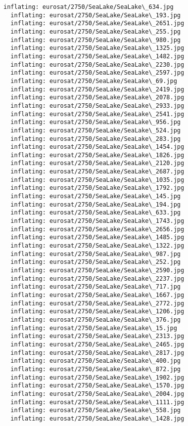\documentclass[11pt]{article}
\begin{document}
\begin{Verbatim}[commandchars=\\\{\}]
  inflating: eurosat/2750/SeaLake/SeaLake\_634.jpg
  inflating: eurosat/2750/SeaLake/SeaLake\_193.jpg
  inflating: eurosat/2750/SeaLake/SeaLake\_2651.jpg
  inflating: eurosat/2750/SeaLake/SeaLake\_255.jpg
  inflating: eurosat/2750/SeaLake/SeaLake\_980.jpg
  inflating: eurosat/2750/SeaLake/SeaLake\_1325.jpg
  inflating: eurosat/2750/SeaLake/SeaLake\_1482.jpg
  inflating: eurosat/2750/SeaLake/SeaLake\_2230.jpg
  inflating: eurosat/2750/SeaLake/SeaLake\_2597.jpg
  inflating: eurosat/2750/SeaLake/SeaLake\_69.jpg
  inflating: eurosat/2750/SeaLake/SeaLake\_2419.jpg
  inflating: eurosat/2750/SeaLake/SeaLake\_2078.jpg
  inflating: eurosat/2750/SeaLake/SeaLake\_2933.jpg
  inflating: eurosat/2750/SeaLake/SeaLake\_2541.jpg
  inflating: eurosat/2750/SeaLake/SeaLake\_956.jpg
  inflating: eurosat/2750/SeaLake/SeaLake\_524.jpg
  inflating: eurosat/2750/SeaLake/SeaLake\_283.jpg
  inflating: eurosat/2750/SeaLake/SeaLake\_1454.jpg
  inflating: eurosat/2750/SeaLake/SeaLake\_1826.jpg
  inflating: eurosat/2750/SeaLake/SeaLake\_2120.jpg
  inflating: eurosat/2750/SeaLake/SeaLake\_2687.jpg
  inflating: eurosat/2750/SeaLake/SeaLake\_1035.jpg
  inflating: eurosat/2750/SeaLake/SeaLake\_1792.jpg
  inflating: eurosat/2750/SeaLake/SeaLake\_145.jpg
  inflating: eurosat/2750/SeaLake/SeaLake\_194.jpg
  inflating: eurosat/2750/SeaLake/SeaLake\_633.jpg
  inflating: eurosat/2750/SeaLake/SeaLake\_1743.jpg
  inflating: eurosat/2750/SeaLake/SeaLake\_2656.jpg
  inflating: eurosat/2750/SeaLake/SeaLake\_1485.jpg
  inflating: eurosat/2750/SeaLake/SeaLake\_1322.jpg
  inflating: eurosat/2750/SeaLake/SeaLake\_987.jpg
  inflating: eurosat/2750/SeaLake/SeaLake\_252.jpg
  inflating: eurosat/2750/SeaLake/SeaLake\_2590.jpg
  inflating: eurosat/2750/SeaLake/SeaLake\_2237.jpg
  inflating: eurosat/2750/SeaLake/SeaLake\_717.jpg
  inflating: eurosat/2750/SeaLake/SeaLake\_1667.jpg
  inflating: eurosat/2750/SeaLake/SeaLake\_2772.jpg
  inflating: eurosat/2750/SeaLake/SeaLake\_1206.jpg
  inflating: eurosat/2750/SeaLake/SeaLake\_376.jpg
  inflating: eurosat/2750/SeaLake/SeaLake\_15.jpg
  inflating: eurosat/2750/SeaLake/SeaLake\_2313.jpg
  inflating: eurosat/2750/SeaLake/SeaLake\_2465.jpg
  inflating: eurosat/2750/SeaLake/SeaLake\_2817.jpg
  inflating: eurosat/2750/SeaLake/SeaLake\_400.jpg
  inflating: eurosat/2750/SeaLake/SeaLake\_872.jpg
  inflating: eurosat/2750/SeaLake/SeaLake\_1902.jpg
  inflating: eurosat/2750/SeaLake/SeaLake\_1570.jpg
  inflating: eurosat/2750/SeaLake/SeaLake\_2004.jpg
  inflating: eurosat/2750/SeaLake/SeaLake\_1111.jpg
  inflating: eurosat/2750/SeaLake/SeaLake\_558.jpg
  inflating: eurosat/2750/SeaLake/SeaLake\_1428.jpg

\end{Verbatim}
\end{document}

